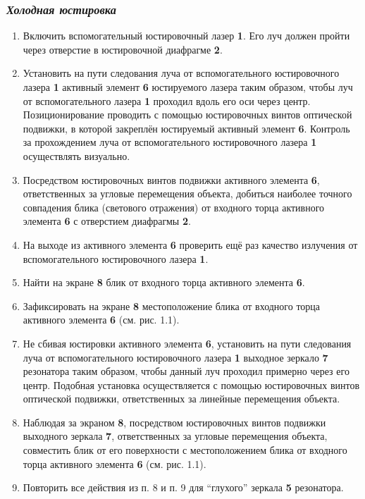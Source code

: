 \documentclass[twocolumn]{article}
\begin{document}
\subsubsection{\emph{Холодная юстировка}}
\begin{enumerate}
\def\labelenumi{\arabic{enumi}.}
\item
  Включить вспомогательный юстировочный лазер \textbf{1}. Его луч должен
  пройти через отверстие в юстировочной диафрагме \textbf{2}.
\item
  Установить на пути следования луча от вспомогательного юстировочного
  лазера \textbf{1} активный элемент \textbf{6} юстируемого лазера таким
  образом, чтобы луч от вспомогательного лазера \textbf{1} проходил
  вдоль его оси через центр. Позиционирование проводить с помощью
  юстировочных винтов оптической подвижки, в которой закреплён
  юстируемый активный элемент \textbf{6}. Контроль за прохождением луча
  от вспомогательного юстировочного лазера \textbf{1} осуществлять
  визуально.
\item
  Посредством юстировочных винтов подвижки активного элемента
  \textbf{6}, ответственных за угловые перемещения объекта, добиться
  наиболее точного совпадения блика (светового отражения) от входного
  торца активного элемента \textbf{6} с отверстием диафрагмы \textbf{2}.
\item
  На выходе из активного элемента \textbf{6} проверить ещё раз качество
  излучения от вспомогательного юстировочного лазера \textbf{1}.
\item
  Найти на экране \textbf{8} блик от входного торца активного элемента
  \textbf{6}.
\item
  Зафиксировать на экране \textbf{8} местоположение блика от входного
  торца активного элемента \textbf{6} (см. рис. 1.1).
\item
  Не сбивая юстировки активного элемента \textbf{6}, установить на пути
  следования луча от вспомогательного юстировочного лазера \textbf{1}
  выходное зеркало \textbf{7} резонатора таким образом, чтобы данный луч
  проходил примерно через его центр. Подобная установка осуществляется с
  помощью юстировочных винтов оптической подвижки, ответственных за
  линейные перемещения объекта.
\item
  Наблюдая за экраном \textbf{8}, посредством юстировочных винтов
  подвижки выходного зеркала \textbf{7}, ответственных за угловые
  перемещения объекта, совместить блик от его поверхности с
  местоположением блика от входного торца активного элемента \textbf{6}
  (см. рис. 1.1).
\item
  Повторить все действия из п. 8 и п. 9 для ``глухого'' зеркала
  \textbf{5} резонатора.
\end{enumerate}
\end{document}
